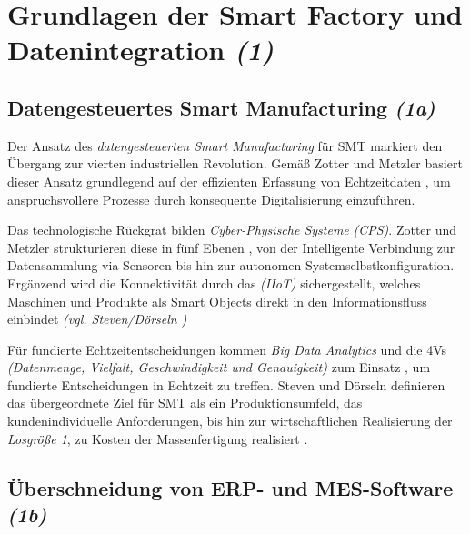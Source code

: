 
\chapter{Grundlagen der Smart Factory und Datenintegration \textit{(1)}}
\label{chap:aufgabe1}
\thispagestyle{fancy}


\section{Datengesteuertes Smart Manufacturing \textit{(1a)}}
\label{sec:1a}

Der Ansatz des \textit{datengesteuerten Smart Manufacturing} für \acs{SMT} markiert den Übergang zur vierten industriellen Revolution. Gemäß Zotter und Metzler basiert dieser Ansatz grundlegend auf der effizienten Erfassung von Echtzeitdaten \cite[2]{2}, um anspruchsvollere Prozesse durch konsequente Digitalisierung einzuführen.

Das technologische Rückgrat bilden \textit{Cyber-Physische Systeme} \textit{(\acs{CPS})}. Zotter und Metzler strukturieren diese in fünf Ebenen \cite[4-5]{2}, von der \glqq Intelligente Verbindung\grqq{} zur Datensammlung via Sensoren bis hin zur autonomen \glqq Systemselbstkonfiguration\grqq. Ergänzend wird die Konnektivität durch das \textit{(\acs{IIoT})} sichergestellt, welches Maschinen und Produkte als \glqq Smart Objects\grqq{} direkt in den Informationsfluss einbindet \textit{(\acs{vgl.} Steven/Dörseln \cite[10]{1})}

Für fundierte Echtzeitentscheidungen kommen \textit{Big Data Analytics} und die \glqq \acs{4Vs}\grqq{} \textit{(Datenmenge, Vielfalt, Geschwindigkeit und Genauigkeit)} zum Einsatz \cite[8-9]{2}, um fundierte Entscheidungen in Echtzeit zu treffen. Steven und Dörseln definieren das übergeordnete Ziel für \acs{SMT} als ein Produktionsumfeld, das kundenindividuelle Anforderungen, bis hin zur wirtschaftlichen Realisierung der \textit{Losgröße 1}, zu Kosten der Massenfertigung realisiert \cite[11]{1}.


\section{Überschneidung von \acs{ERP}- und \acs{MES}-Software \textit{(1b)}}
\label{sec:1b}

